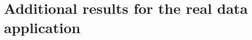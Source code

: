 \documentclass[12pt]{article}
\newcommand{\Gam}{\operatorname{Gam}}
\newcommand{\Tree}{\mathcal T}
\begin{document}

\clearpage

\section{Additional results for the real data application}\label{sec:appendix_application}

\end{document}
